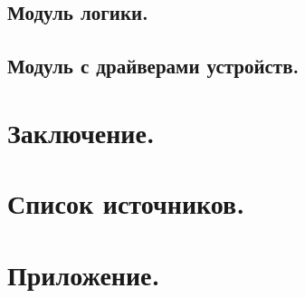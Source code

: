 \subsection{Модуль логики.}

\subsection{Модуль с драйверами устройств.}

\clearpage

\section{Заключение.}

\clearpage

\section{Список источников.}

\clearpage

\section{Приложение.}
